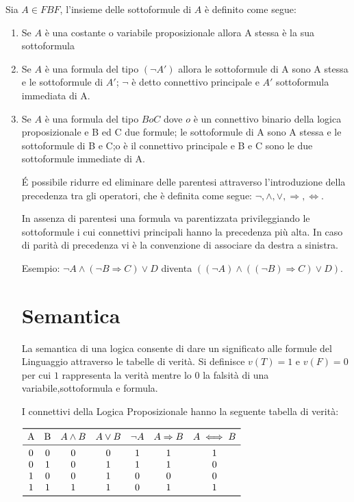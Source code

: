 Sia $A \in FBF$, l'insieme delle sottoformule di $A$ è definito come segue:
\begin{enumerate}
\item Se $A$ è una costante o variabile proposizionale allora A stessa è la sua sottoformula
\item Se $A$ è una formula del tipo $(\neg A')$ allora le sottoformule di A sono A stessa e le sottoformule di $A'$;
      $\neg$ è detto connettivo principale e $A'$ sottoformula immediata di A.
\item Se $A$ è una formula del tipo $B o C$ dove $o$ è un connettivo binario della logica proposizionale e B ed C due formule;
      le sottoformule di A sono A stessa e le sottoformule di B e C;o è il connettivo principale e B e C sono le due sottoformule immediate di A.


É possibile ridurre ed eliminare delle parentesi attraverso l'introduzione della
precedenza tra gli operatori, che è definita come segue:\newline
$\neg, \land, \lor, \Rightarrow,\iff$.

In assenza di parentesi una formula va parentizzata privileggiando le sottoformule
i cui connettivi principali hanno la precedenza più alta.\newline
In caso di parità di precedenza vi è la convenzione di associare da destra a sinistra.

Esempio:\newline
$\neg A \land (\neg B \Rightarrow C) \lor D$ diventa
$((\neg A) \land ((\neg B) \Rightarrow C) \lor D)$.

\section{Semantica}
La semantica di una logica consente di dare un significato alle formule del Linguaggio
attraverso le tabelle di verità.\newline
Si definisce $v(T) = 1$ e $v(F) = 0$ per cui $1$ rappresenta la verità mentre lo $0$
la falsità di una variabile,sottoformula e formula.

I connettivi della Logica Proposizionale hanno la seguente tabella di verità:\newline

$\begin{array}{ccccccc}
\toprule
\text{A} & \text{B} & A \land B & A \lor B & \neg A & A \Rightarrow B & A \iff B \\
\midrule
    0 & 0 & 0 & 0 & 1 & 1 & 1 \\
    0 & 1 & 0 & 1 & 1 & 1 & 0 \\
    1 & 0 & 0 & 1 & 0 & 0 & 0 \\
    1 & 1 & 1 & 1 & 0 & 1 & 1 \\
\bottomrule
\end{array}$\newline


\end{enumerate}
